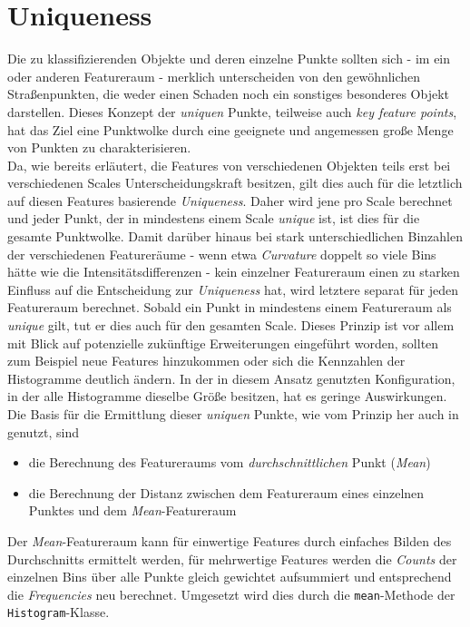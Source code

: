 
\chapter{Uniqueness}
\label{chap:uniqueness}

Die zu klassifizierenden Objekte und deren einzelne Punkte sollten sich - im ein oder anderen Featureraum - merklich unterscheiden von den gewöhnlichen Straßenpunkten, die weder einen Schaden noch ein sonstiges besonderes Objekt darstellen. Dieses Konzept der \textit{uniquen} Punkte, teilweise auch \textit{key feature points}, hat das Ziel eine Punktwolke durch eine geeignete und angemessen große Menge von Punkten zu charakterisieren. \\
Da, wie bereits erläutert, die Features von verschiedenen Objekten teils erst bei verschiedenen Scales Unterscheidungskraft besitzen, gilt dies auch für die letztlich auf diesen Features basierende \textit{Uniqueness}. Daher wird jene pro Scale berechnet und jeder Punkt, der in mindestens einem Scale \textit{unique} ist, ist dies für die gesamte Punktwolke. Damit darüber hinaus bei stark unterschiedlichen Binzahlen der verschiedenen Featureräume - wenn etwa \textit{Curvature} doppelt so viele Bins hätte wie die Intensitätsdifferenzen - kein einzelner Featureraum einen zu starken Einfluss auf die Entscheidung zur \textit{Uniqueness} hat, wird letztere separat für jeden Featureraum berechnet. Sobald ein Punkt in mindestens einem Featureraum als \textit{unique} gilt, tut er dies auch für den gesamten Scale. Dieses Prinzip ist vor allem mit Blick auf potenzielle zukünftige Erweiterungen eingeführt worden, sollten zum Beispiel neue Features hinzukommen oder sich die Kennzahlen der Histogramme deutlich ändern. In der in diesem Ansatz genutzten Konfiguration, in der alle Histogramme dieselbe Größe besitzen, hat es geringe Auswirkungen. \\
Die Basis für die Ermittlung dieser \textit{uniquen} Punkte, wie vom Prinzip her auch in \cite{Rusu.etal-2008} genutzt, sind 
\begin{itemize}
    \item die Berechnung des Featureraums vom \textit{durchschnittlichen} Punkt (\textit{Mean})
    \item die Berechnung der Distanz zwischen dem Featureraum eines einzelnen Punktes und dem \textit{Mean}-Featureraum
\end{itemize}
Der \textit{Mean}-Featureraum kann für einwertige Features durch einfaches Bilden des Durchschnitts ermittelt werden, für mehrwertige Features werden die \textit{Counts} der einzelnen Bins über alle Punkte gleich gewichtet aufsummiert und entsprechend die \textit{Frequencies} neu berechnet. Umgesetzt wird dies durch die \texttt{mean}-Methode der \texttt{Histogram}-Klasse. \\\\
